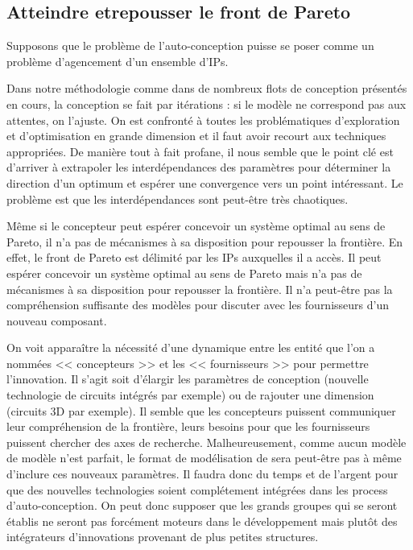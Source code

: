 \documentclass[11pt]{article}
\begin{document}
\subsection{Atteindre etrepousser le front de Pareto}

Supposons que le problème de l'auto-conception puisse se poser comme un problème d'agencement d'un ensemble d'IPs.

Dans notre méthodologie comme dans de nombreux flots de conception présentés en cours, la conception se fait par itérations : si le modèle ne correspond pas aux attentes, on l'ajuste. On est confronté à toutes les problématiques d'exploration et d'optimisation en grande dimension et il faut avoir recourt aux techniques appropriées. De manière tout à fait profane, il nous semble que le point clé est d'arriver à extrapoler les interdépendances des paramètres pour déterminer la direction d'un optimum et espérer une convergence vers un point intéressant. Le problème est que les interdépendances sont peut-être très chaotiques.

Même si le concepteur peut espérer concevoir un système optimal au sens de Pareto, il n'a pas de mécanismes à sa disposition pour repousser la frontière. En effet, le front de Pareto est délimité par les IPs auxquelles il a accès. Il peut espérer concevoir un système optimal au sens de Pareto mais n'a pas de mécanismes à sa disposition pour repousser la frontière. Il n'a peut-être pas la compréhension suffisante des modèles pour discuter avec les fournisseurs d'un nouveau composant. 

On voit apparaître la nécessité d'une dynamique entre les entité que l'on a nommées << concepteurs >> et les << fournisseurs >> pour permettre l'innovation. Il s'agit soit d'élargir les paramètres de conception (nouvelle technologie de circuits intégrés par exemple) ou de rajouter une dimension (circuits 3D par exemple). Il semble que les concepteurs puissent communiquer leur compréhension de la frontière, leurs besoins pour que les fournisseurs puissent chercher des axes de recherche. Malheureusement, comme aucun modèle de modèle n'est parfait, le format de modélisation de sera peut-être pas à même d'inclure ces nouveaux paramètres. Il faudra donc du temps et de l'argent pour que des nouvelles technologies soient complétement intégrées dans les process d'auto-conception. On peut donc supposer que les grands groupes qui se seront établis ne seront pas forcément moteurs dans le développement mais plutôt des intégrateurs d'innovations provenant de plus petites structures.
\end{document}
